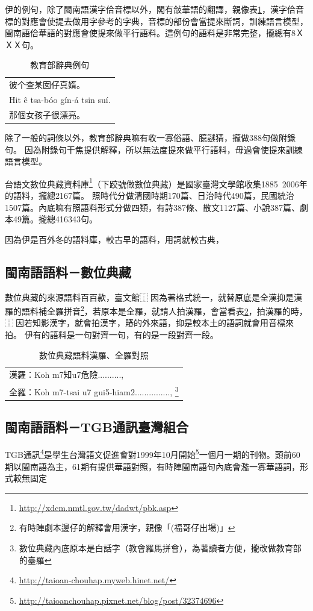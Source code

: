 伊的例句，除了閩南語漢字佮音標以外，閣有敆華語的翻譯，親像表\ref{表：教育部辭典例句}，漢字佮音標的對應會使提去做用字參考的字典，音標的部份會當提來斷詞，訓練語言模型，閩南語佮華語的對應會使提來做平行語料。這例句的語料是非常完整，攏總有8ＸＸＸ句。
\begin{table}
\caption{教育部辭典例句}
\label{表：教育部辭典例句}
\centering
\begin{tabular}{l}
彼个查某囡仔真媠。 \\
Hit ê tsa-bóo gín-á tsin suí.\\
那個女孩子很漂亮。\\
\end{tabular}
\end{table}

除了一般的詞條以外，教育部辭典嘛有收一寡俗語、臆謎猜，攏做388句做附錄句。
因為附錄句干焦提供解釋，所以無法度提來做平行語料，毋過會使提來訓練語言模型。

台語文數位典藏資料庫\footnote{\url{http://xdcm.nmtl.gov.tw/dadwt/pbk.asp}}（下跤號做數位典藏）是國家臺灣文學館收集1885~2006年的語料，攏總2167篇。
照時代分做清國時期170篇、日治時代490篇，民國統治1507篇。內底嘛有照語料形式分做四類，有詩387條、散文1127篇、小說387篇、劇本49篇。攏總416343句。

因為伊是百外冬的語料庫，較古早的語料，用詞就較古典， %

\subsection{閩南語語料－數位典藏}
\label{節：數位典藏}
數位典藏的來源語料百百款，臺文館⿰因為著格式統一，就替原底是全漢抑是漢羅的語料補全羅拼音\footnote{有時陣劇本邊仔的解釋會用漢字，親像「(福哥仔出場)」}，若原本是全羅，就請人拍漢羅，會當看表\ref{表：數位典藏語料}，拍漢羅的時，⿰因若知影漢字，就會拍漢字，賰的外來語，抑是較本土的語詞就會用音標來拍。
伊有的語料是一句對齊一句，有的是一段對齊一段。

\begin{table}
\caption{數位典藏語料漢羅、全羅對照}
\label{表：數位典藏語料}
\centering
\begin{tabular}{l}
漢羅：Koh m7知u7危險.........., \\
全羅：Koh m7-tsai u7 gui5-hiam2..............., \footnote{數位典藏內底原本是白話字（教會羅馬拼會），為著讀者方便，攏改做教育部的臺羅}\\
\end{tabular}
\end{table}


\subsection{閩南語語料－TGB通訊臺灣組合}
\label{節：TGB通訊－臺灣組合}
TGB通訊\footnote{\url{http://taioan-chouhap.myweb.hinet.net/}}是學生台灣語文促進會對1999年10月開始\footnote{\url{http://taioanchouhap.pixnet.net/blog/post/32374696}}一個月一期的刊物。頭前60期以閩南語為主，61期有提供華語對照，有時陣閩南語句內底會濫一寡華語詞，形式較無固定

